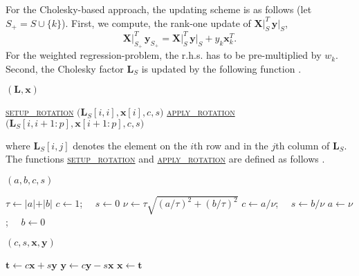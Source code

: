 \documentclass[a4paper,oneside,11pt,DIV=12]{scrartcl}
\begin{document}
For the Cholesky-based approach, the updating scheme is as follows
(let $S_{+} = S \cup \{k\}$). First, we compute, the rank-one update
of $\bm X\vert_S^T \, \bm y\vert_S$,
\begin{equation}\label{eq:xtyupdate}
	\bm X\vert_{S_+}^T \, \bm y_{S_+} = \bm X\vert_{S}^T \,
		\bm y \vert_S + y_k \bm x_k^T.
\end{equation}
\noindent For the weighted regression-problem, the r.h.s. has to be
pre-multiplied by $w_k$. Second, the Cholesky factor $\bm L_S$ is updated
by the following function \citep[][p. 340]{stewart_1998}.
\begin{algorithmic}[1]
	\hypertarget{alg:cholupdate}{$(\bm L, \bm x)$}
		\State  \hyperlink{alg:setuprotation}{\textsc{setup\_rotation}}
			$\big(\bm L_S[i,i], \bm x[i], c, s\big)$
		\State \hyperlink{alg:applyrotation}{\textsc{apply\_rotation}}
			$\big(\bm L_S[i, i+1:p], \bm x[i+1:p], c, s\big)$
	\EndFor
	\EndFunction
\end{algorithmic}
\noindent where $\bm L_S[i,j]$ denotes the element on the $i$th row and
in the $j$th column of $\bm L_S$. The functions
\hyperlink{alg:setuprotation}{\textsc{setup\_rotation}} and
\hyperlink{alg:applyrotation}{\textsc{apply\_rotation}} are defined
as follows \citep[][Algorithms 1.6 and 1.7]{stewart_1998}.
\begin{algorithmic}[1]
	\hypertarget{alg:setuprotation}{$(a,b,c,s)$}
	\State $\tau \gets \vert a \vert + \vert b \vert$
	\If{$\tau \leq \epsilon$}
		\State $c \gets 1$; $\quad s \gets 0$
		\State \Return
	\EndIf
	\State $\nu \gets \tau \sqrt{(a/\tau)^2 + (b/\tau)^2}$
	\State $c \gets a/\nu$; $\quad s \gets b/\nu$
	\State $a \gets \nu$; $\quad b \gets 0$
	\EndFunction
\end{algorithmic}
\begin{algorithmic}[1]
	\hypertarget{alg:applyrotation}{
		$(c, s, \bm x, \bm y)$}
	\State $\bm t \gets c \bm x + s \bm y$
	\State $\bm y \gets c \bm y - s \bm x$
	\State $\bm x \gets \bm t$
	\EndFunction
\end{algorithmic}
\end{document}
